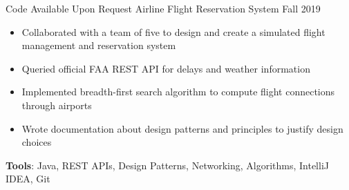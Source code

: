 \documentclass{awesome-cv}
\begin{document}
\begin{cventries}
			\cventryB
				{Code Available Upon Request}
				{Airline Flight Reservation System\small{\textnormal{\color{graytext}{\enskip Engineering of Software Subsystems}}}}
				{Fall 2019}
				{}
				{
					\vspace{-0.25cm}
					\begin{itemize}[nosep]
						\item Collaborated with a team of five to design and create a simulated flight management and reservation system
						\item Queried official FAA REST API for delays and weather information
						\item Implemented breadth-first search algorithm to compute flight connections through airports
						\item Wrote documentation about design patterns and principles to justify design choices
					\end{itemize}
					\vspace{0.2cm}
					\qquad \textbf{Tools}: Java, REST APIs, Design Patterns, Networking, Algorithms, IntelliJ IDEA, Git
				}


		
		\end{cventries}
\end{document}
